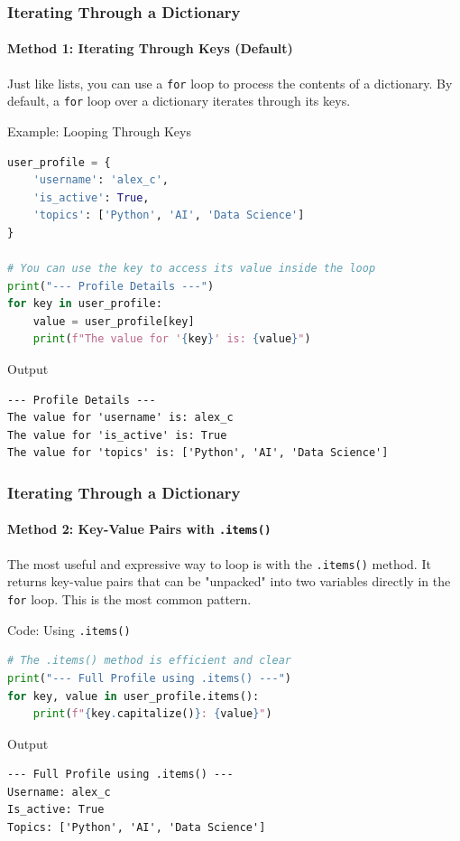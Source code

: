 \documentclass{beamer}
\begin{document}
\begin{frame}[fragile]
    \frametitle{Iterating Through a Dictionary}
    \framesubtitle{Method 1: Iterating Through Keys (Default)}

    Just like lists, you can use a \texttt{for} loop to process the contents of a dictionary. By default, a \texttt{for} loop over a dictionary iterates through its keys.

    \begin{block}{Example: Looping Through Keys}
\begin{lstlisting}[language=Python]
user_profile = {
    'username': 'alex_c', 
    'is_active': True, 
    'topics': ['Python', 'AI', 'Data Science']
}

# You can use the key to access its value inside the loop
print("--- Profile Details ---")
for key in user_profile:
    value = user_profile[key]
    print(f"The value for '{key}' is: {value}")
\end{lstlisting}
    \end{block}
    
    \begin{block}{Output}
\begin{verbatim}
--- Profile Details ---
The value for 'username' is: alex_c
The value for 'is_active' is: True
The value for 'topics' is: ['Python', 'AI', 'Data Science']
\end{verbatim}
    \end{block}
\end{frame}

\begin{frame}[fragile]
    \frametitle{Iterating Through a Dictionary}
    \framesubtitle{Method 2: Key-Value Pairs with \texttt{.items()}}

    The most useful and expressive way to loop is with the \texttt{.items()} method. It returns key-value pairs that can be "unpacked" into two variables directly in the \texttt{for} loop. This is the most common pattern.

    \begin{block}{Code: Using \texttt{.items()}}
\begin{lstlisting}[language=Python]
# The .items() method is efficient and clear
print("--- Full Profile using .items() ---")
for key, value in user_profile.items():
    print(f"{key.capitalize()}: {value}")
\end{lstlisting}
    \end{block}

    \begin{block}{Output}
\begin{verbatim}
--- Full Profile using .items() ---
Username: alex_c
Is_active: True
Topics: ['Python', 'AI', 'Data Science']
\end{verbatim}
    \end{block}
\end{frame}
\end{document}
